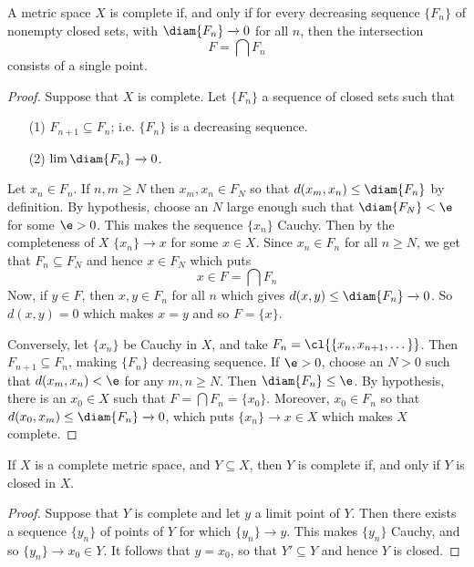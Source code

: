 \begin{theorem}\label{2.3.4}
    A metric space $X$ is complete if, and only if for every decreasing sequence
    $\{F_n\}$ of nonempty closed sets, with $\diam{F_n} \xrightarrow{} 0$ for
    all $n$, then the intersection
    \begin{equation*}
        F=\bigcap{F_n}
    \end{equation*}
    consists of a single point.
\end{theorem}
\begin{proof}
    Suppose that $X$ is complete. Let  $\{F_n\}$ a sequence of closed sets such
    that
    \begin{enumerate}
        \item[(1)] $F_{n+1} \subseteq F_n$; i.e. $\{F_n\}$ is a decreasing sequence.

        \item[(2)] $\lim{\diam{F_n}} \xrightarrow{} 0$.
    \end{enumerate}
    Let $x_n \in F_n$. If  $n,m \geq N$ then  $x_m,x_n \in F_N$ so that
    $d(x_m,x_n) \leq \diam{F_n}$ by definition. By hypothesis, choose an $N$
    large enough such that  $\diam{F_N}<\e$ for some $\e>0$. This makes the
    sequence  $\{x_n\}$ Cauchy. Then by the completeness of $X$  $\{x_n\}
    \xrightarrow{} x$ for some $x \in X$. Since $x_n \in F_n$ for all  $n \geq N$,
    we get that  $F_n \subseteq F_N$ and hence  $x \in F_N$ which puts
    \begin{equation*}
        x \in F=\bigcap{F_n}
    \end{equation*}
    Now, if $y \in F$, then $x,y \in F_n$ for all  $n$ which gives  $d(x,y) \leq
    \diam{F_n} \xrightarrow{} 0$. So $d(x,y)=0$ which makes $x=y$ and so
    $F=\{x\}$.

    Conversely, let $\{x_n\}$ be Cauchy in $X$, and take
    $F_n=\cl{\{x_n,x_{n+1}, \dots\}}$. Then $F_{n+1} \subseteq F_n$, making
    $\{F_n\}$ decreasing sequence. If $\e>0$, choose an  $N>0$ such that
    $d(x_m,x_n)<\e$ for any $m,n \geq N$. Then  $\diam{F_n} \leq \e$. By
    hypothesis, there is an $x_0 \in X$ such that $F=\bigcap{F_n}=\{x_0\}$.
    Moreover, $x_0 \in F_n$ so that $d(x_0,x_m) \leq \diam{F_n} \xrightarrow{}
    0$, which puts $\{x_n\} \xrightarrow{} x \in X$ which makes $X$ complete.
\end{proof}

\begin{lemma}\label{2.3.5}
    If $X$ is a complete metric space, and  $Y \subseteq X$, then $Y$ is
    complete if, and only if  $Y$ is closed in  $X$.
\end{lemma}
\begin{proof}
    Suppose that $Y$ is complete and let  $y$ a limit point of  $Y$. Then there
    exists a sequence $\{y_n\}$ of points of $Y$ for which  $\{y_n\}
    \xrightarrow{} y$. This makes $\{y_n\}$ Cauchy, and so $\{y_n\}
    \xrightarrow{} x_0 \in Y$. It follows that $y=x_0$, so that $Y' \subseteq Y$
    and hence  $Y$ is closed.
\end{proof}
